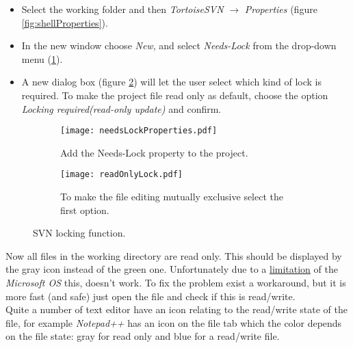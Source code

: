 \begin{itemize}

    \item Select the working folder and then \textit{TortoiseSVN} $\rightarrow$ \textit{Properties} (figure \ref{fig:shellProperties}).
    
    \item In the new window choose \textit{New}, and select \textit{Needs-Lock} from the drop-down menu (\ref{fig:needsLockProperties}).
    
    \item A new dialog box (figure \ref{fig:readOnlyLock}) will let the user select which kind of lock is required. To make the project file read only as default, choose the option \textit{Locking required(read-only update)} and confirm.
    
\end{itemize}




\begin{figure}[htbp]
\begin{subfigure}{0.5\textwidth}
  \centering
  \texttt{[image: needsLockProperties.pdf]}
  \caption{Add the Needs-Lock property to the project.}
  \label{fig:needsLockProperties}
\end{subfigure}%
\hspace{5mm}
\begin{subfigure}{0.5\textwidth}
  \centering
  \texttt{[image: readOnlyLock.pdf]}
  \caption{To make the file editing mutually exclusive select the first option.}
  \label{fig:readOnlyLock}
\end{subfigure}
\caption{SVN locking function.}
\label{fig:svnKeepLocks}
\end{figure}

Now all files in the working directory are read only. This should be displayed by the gray icon instead of the green one. Unfortunately due to a \href{http://tortoisesvn.tigris.org/faq.html#ovlnotall}{limitation} of the \textit{Microsoft OS} this, doesn't work. To fix the problem exist a workaround, but it is more fast (and safe) just open the file and check if this is read/write.\\

Quite a number of text editor have an icon relating to the read/write state of the file, for example \textit{Notepad++} has an icon on the file tab which the color depends on the file state: gray for read only and blue for a read/write file.\newline


